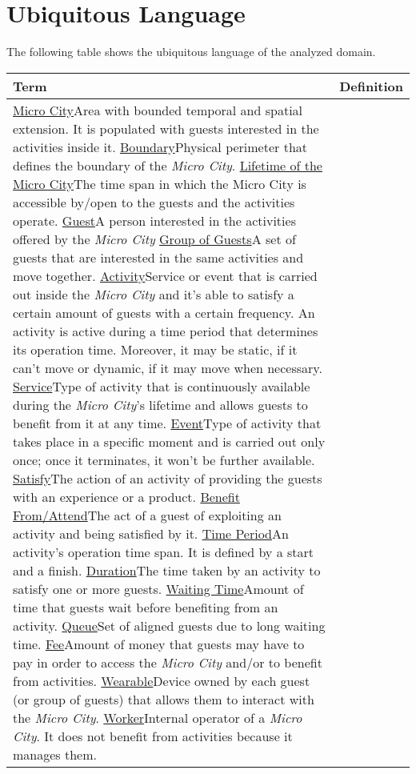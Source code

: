 \section{Ubiquitous Language}\label{sec:ubiquitous-language}

The following table shows the ubiquitous language of the analyzed domain.

\begin{longtable}{|l|p{}|}
    \hline
    \textbf{Term} & \textbf{Definition}\\
    \hline
    \ul{Micro City}{Area with bounded temporal and spatial extension. It is populated with guests interested in the activities inside it.}
    \ul{Boundary}{Physical perimeter that defines the boundary of the \textit{Micro City}.}
    \ul{Lifetime of the Micro City}{The time span in which the Micro City is accessible by/open to the guests and the activities operate.}
    \ul{Guest}{A person interested in the activities offered by the \textit{Micro City}}
    \ul{Group of Guests}{A set of guests that are interested in the same activities and move together.}
    \ul{Activity}{Service or event that is carried out inside the \textit{Micro City} and it's able to satisfy a certain amount of guests with a certain frequency. An activity is active during a time period that determines its operation time. Moreover, it may be static, if it can't move or dynamic, if it may move when necessary.}
    \ul{Service}{Type of activity that is continuously available during the \textit{Micro City}'s lifetime and allows guests to benefit from it at any time.}
    \ul{Event}{Type of activity that takes place in a specific moment and is carried out only once; once it terminates, it won't be further available.}
    \ul{Satisfy}{The action of an activity of providing the guests with an experience or a product.}
    \ul{Benefit From/Attend}{The act of a guest of exploiting an activity and being satisfied by it.}
    \ul{Time Period}{An activity's operation time span. It is defined by a start and a finish.}
    \ul{Duration}{The time taken by an activity to satisfy one or more guests.}
    \ul{Waiting Time}{Amount of time that guests wait before benefiting from an activity.}
    \ul{Queue}{Set of aligned guests due to long waiting time.}
    \ul{Fee}{Amount of money that guests may have to pay in order to access the \textit{Micro City} and/or to benefit from activities.}
    \ul{Wearable}{Device owned by each guest (or group of guests) that allows them to interact with the \textit{Micro City}.}
    \ul{Worker}{Internal operator of a \textit{Micro City}. It does not benefit from activities because it manages them.}

\end{longtable}
